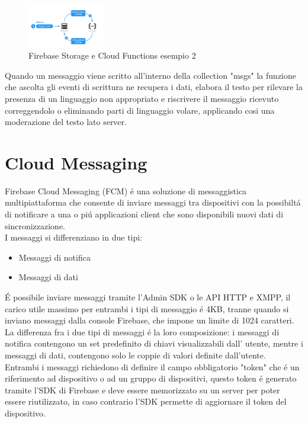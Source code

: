 \begin{figure}[h!]
  \centering
  \includegraphics[width=0.3\textwidth]{immagini/functions_ex2.png}
  \caption{Firebase Storage e Cloud Functions esempio 2}
  \label{fig:Firebase Storage e Cloud Functions esempio 2}
\end{figure}

Quando un messaggio viene scritto all'interno della collection "msgs" la funzione che ascolta gli eventi di scrittura ne recupera i dati, elabora il testo per rilevare la presenza di un linguaggio non appropriato e riscrivere il messaggio ricevuto correggendolo o eliminando parti di linguaggio volare, applicando cosi una moderazione del testo lato server.


\section{Cloud Messaging}                 %
Firebase Cloud Messaging (FCM) \'e una soluzione di messaggistica multipiattaforma che consente di inviare messaggi tra dispositivi con la possibilt\'a di notificare a una o pi\'u applicazioni client che sono disponibili nuovi dati di sincronizzazione.\\

I messaggi si differenziano in due tipi:
\begin{itemize}
  \item Messaggi di notifica
  \item Messaggi di dati

\end{itemize}

\'E possibile inviare messaggi tramite l'Admin SDK o le API HTTP e XMPP, il carico utile massimo per entrambi i tipi di messaggio \'e 4KB, tranne quando si inviano messaggi dalla console Firebase, che impone un limite di 1024 caratteri.\\
La differenza fra i due tipi di messaggi \'e la loro composizione: i messaggi di notifica contengono un set predefinito di chiavi visualizzabili dall' utente, mentre i messaggi di dati, contengono solo le coppie di valori definite dall'utente.\\
Entrambi i messaggi richiedono di definire il campo obbligatorio "token" che \'e un riferimento ad dispositivo o ad un gruppo di dispositivi, questo token \'e generato tramite l'SDK di Firebase e deve essere memorizzato su un server per poter essere riutilizzato, in caso contrario l'SDK permette di aggiornare il token del dispositivo.\\

